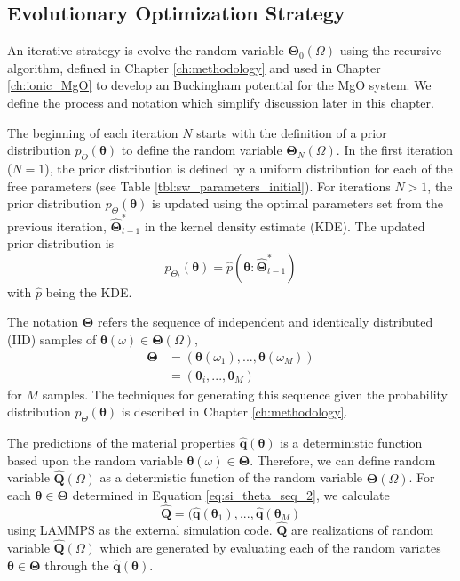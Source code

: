 \subsection{Evolutionary Optimization Strategy}

An iterative strategy is evolve the random variable $\bm{\Theta}_0(\Omega)$ using the recursive algorithm, defined in Chapter \ref{ch:methodology} and used in Chapter \ref{ch:ionic_MgO} to develop an Buckingham potential for the MgO system.  We define the process and notation which simplify discussion later in this chapter.

The beginning of each iteration $N$ starts with the definition of a prior distribution $p_{\Theta}(\bm{\theta})$ to define the random variable $\bm{\Theta}_{N}(\Omega)$.  In the first iteration ($N=1$), the prior distribution is defined by a uniform distribution for each of the free parameters (see Table \ref{tbl:sw_parameters_initial}).  For iterations $N>1$, the prior distribution
$p_{\Theta}(\bm{\theta})$ is updated using the optimal parameters set from the previous iteration, $\hat{\bm{\Theta}}_{t-1}^*$ in the kernel density estimate (KDE)\cite{rosenblatt1956_kde,parzen1962_kde}.  The updated prior distribution is
\begin{equation}
  \label{eq:si_updated_prior}
  p_{\Theta_{t}}(\bm{\theta})
  =
  \hat{p} (\bm{\theta}:\hat{\bm{\Theta}}_{t-1}^*)
\end{equation}
with $\hat{p}$ being the KDE.

The notation $\bm{\Theta}$ refers the sequence of independent and identically distributed (IID) samples of $\bm{\theta}(\omega) \in \bm{\Theta}(\Omega)$,
\begin{subequations}
  \begin{align}
     \bm{\Theta}
       &= (\bm{\theta}(\omega_1), ...,\bm{\theta}(\omega_M))
	  \label{eq:si_theta_seq_1} \\
       &= (\bm{\theta}_i,...,\bm{\theta}_M)
	  \label{eq:si_theta_seq_2}
  \end{align}
\end{subequations}
for $M$ samples. The techniques for generating this sequence given the probability distribution $p_\Theta(\bm{\theta})$ is described in Chapter \ref{ch:methodology}.

The predictions of the material properties $\hat{\bm{q}}(\bm{\theta})$ is a deterministic function based upon the random variable $\bm{\theta}(\omega) \in \bm{\Theta}$.  Therefore, we can define random variable $\hat{\bm{Q}}(\Omega)$ as a determistic function of the random variable $\bm{\Theta}(\Omega)$.  For each $\bm{\theta} \in \bm{\Theta}$ determined in Equation \ref{eq:si_theta_seq_2}, we calculate
\begin{equation}
  \hat{\bm{Q}} = (\hat{\bm{q}}(\bm{\theta}_1),...,\hat{\bm{q}}(\bm{\theta}_M)
\end{equation}
using LAMMPS\cite{plimpton1995_lammps} as the external simulation code.  $\hat{\bm{Q}}$ are realizations of random variable $\hat{\bm{Q}}(\Omega)$ which are generated by evaluating each of the random variates $\bm{\theta} \in \bm{\Theta}$ through the $\hat{\bm{q}}(\bm{\theta})$.

